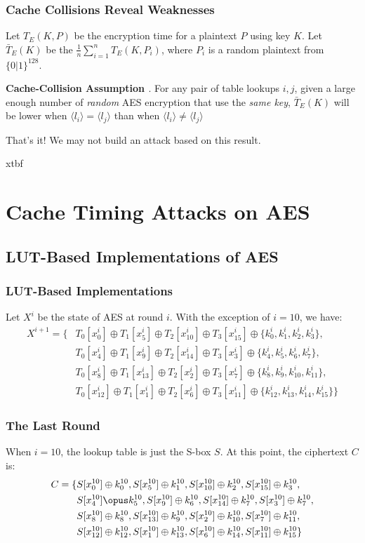 \documentclass[8pt,handout]{beamer}
\begin{document}
\begin{frame}
	\frametitle{Cache Collisions Reveal Weaknesses}
	Let $T_E(K, P)$ be the encryption time for a plaintext $P$ using key $K$. 
	Let $\bar{T}_E(K)$ be the $\frac{1}{n}\sum_{i = 1}^{n}T_E(K, P_i)$, where $P_i$ is a random plaintext from $\{0|1\}^{128}$.

	\medskip

	\textbf{Cache-Collision Assumption \cite{bonneau}}. For any pair of table lookups $i, j$, given
a large enough number of \emph{random} AES encryption that use the \emph{same key}, $\bar{T}_E(K)$ will
be lower when $\langle l_i \rangle = \langle l_j \rangle$ than when $\langle l_i \rangle \not= \langle l_j \rangle$

	\medskip

	That's it! We may not build an attack based on this result.
\end{frame}
xtbf
\section{Cache Timing Attacks on AES}
\subsection{LUT-Based Implementations of AES}
\begin{frame}
	\frametitle{LUT-Based Implementations}
	Let $X^i$ be the state of AES at round $i$. With the exception of $i = 10$, we have:
\begin{align*}
X^{i+1} = \{ & T_0[x_0^i] \oplus T_1[x_5^i] \oplus T_2[x_{10}^i] \oplus T_3[x_{15}^i] \oplus \{k_0^i, k_1^i, k_2^i, k_3^i\}, \\
& T_0[x_4^i] \oplus T_1[x_{9}^i] \oplus T_2[x_{14}^i] \oplus T_3[x_3^i] \oplus \{k_4^i, k_5^i, k_6^i, k_7^i\}, \\
& T_0[x_8^i] \oplus T_1[x_{13}^i] \oplus T_2[x_2^i] \oplus T_3[x_7^i] \oplus \{k_8^i, k_9^i, k_{10}^i, k_{11}^i\}, \\
& T_0[x_{12}^i] \oplus T_1[x_1^i] \oplus T_2[x_6^i] \oplus T_3[x_{11}^i] \oplus \{k_{12}^i, k_{13}^i, k_{14}^i, k_{15}^i\}\}
\end{align*}
\end{frame}

\begin{frame}
	\frametitle{The Last Round}
	When $i = 10$, the lookup table is just the S-box $S$. At this point, the ciphertext $C$ is:
\begin{align*}
C = \{ & S[x_0^{10}] \oplus k_0^{10}, S[x_5^{10}] \oplus k_1^{10}, S[x_{10}^{10}] \oplus k_2^{10}, S[x_{15}^{10}] \oplus k_3^{10}, \\
& S[x_4^{10}] \opus k_5^{10}, S[x_9^{10}] \oplus k_6^{10}, S[x_{14}^{10}] \oplus k_7^{10}, S[x_3^{10}] \oplus k_7^{10}, \\
& S[x_8^{10}] \oplus k_8^{10}, S[x_{13}^{10}] \oplus k_9^{10}, S[x_2^{10}] \oplus k_{10}^{10}, S[x_7^{10}] \oplus k_{11}^{10}, \\
& S[x_{12}^{10}] \oplus k_{12}^{10}, S[x_{1}^{10}] \oplus k_{13}^{10}, S[x_6^{10}] \oplus k_{14}^{10}, S[x_{11}^{10}] \oplus k_{15}^{10}\} 
\end{align*}
\end{frame}
\end{document}
